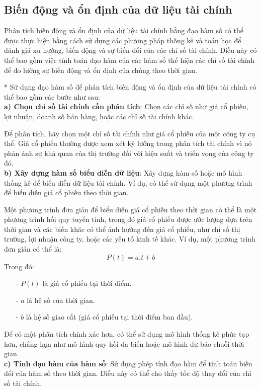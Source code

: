 \documentclass[12pt,a4paper]{report}
\begin{document}
\subsection{Biến động và ổn định của dữ liệu tài chính}
Phân tích biến động và ổn định của dữ liệu tài chính bằng đạo hàm số có thể được thực hiện bằng cách sử dụng các phương pháp thống kê và toán học để đánh giá xu hướng, biến động và sự biến đổi của các chỉ số tài chính. Điều này có thể bao gồm việc tính toán đạo hàm của các hàm số thể hiện các chỉ số tài chính để đo lường sự biến động và ổn định của chúng theo thời gian.

* Sử dụng đạo hàm số để phân tích biến động và ổn định của dữ liệu tài chính có thể bao gồm các bước như sau:\\
\textbf{a) Chọn chỉ số tài chính cần phân tích}: Chọn các chỉ số như giá cổ phiếu, lợi nhuận, doanh số bán hàng, hoặc các chỉ số tài chính khác.

Để phân tích, hãy chọn một chỉ số tài chính như giá cổ phiếu của một công ty cụ thể. Giá cổ phiếu thường được xem xét kỹ lưỡng trong phân tích tài chính vì nó phản ánh sự khả quan của thị trường đối với hiệu suất và triển vọng của công ty đó.\\
\textbf{b) Xây dựng hàm số biểu diễn dữ liệu}: Xây dựng hàm số hoặc mô hình thống kê để biểu diễn dữ liệu tài chính. Ví dụ, có thể sử dụng một phương trình để biểu diễn giá cổ phiếu theo thời gian.

Một phương trình đơn giản để biểu diễn giá cổ phiếu theo thời gian có thể là một phương trình hồi quy tuyến tính, trong đó giá cổ phiếu được ước lượng dựa trên thời gian và các biến khác có thể ảnh hưởng đến giá cổ phiếu, như chỉ số thị trường, lợi nhuận công ty, hoặc các yếu tố kinh tế khác. Ví dụ, một phương trình đơn giản có thể là:
\[
    P(t) = a.t + b
\]
\newpage
Trong đó:
\begin{itemize}
    \item[-] $P(t)$ là giá cổ phiếu tại thời điểm.
    \item[-] $a$ là hệ số của thời gian.
    \item[-] $b$ là hệ số giao cắt (giá cổ phiếu tại thời điểm ban đầu).
\end{itemize}

Để có một phân tích chính xác hơn, có thể sử dụng mô hình thống kê phức tạp hơn, chẳng hạn như mô hình quy hồi đa biến hoặc mô hình dự báo chuỗi thời gian.\\
\textbf{c) Tính đạo hàm của hàm số}: Sử dụng phép tính đạo hàm để tính toán biến đổi của hàm số theo thời gian. Điều này có thể cho thấy tốc độ thay đổi của chỉ số tài chính.
\end{document}
